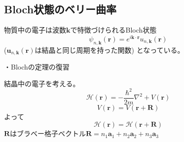 \documentclass[a4paper,11pt,dvipdfmx]{jsarticle}
\theoremstyle{definition}%
\numberwithin{equation}{section}%
\numberwithin{theorem}{section} %
\begin{document}
  \subsection{Bloch状態のベリー曲率}
  物質中の電子は波数\(\bm{k}\)で特徴づけられるBloch状態
  \begin{equation}
    \psi_{n,\bm{k}}(\bm{r})=e^{i\bm{k}\cdot\bm{r}}u_{n,\bm{k}}(\bm{r})\tag{1.4.1}
  \end{equation}
  (\(\bm{u}_{n,\bm{k}}(\bm{r})\)は結晶と同じ周期を持った関数)
となっている。


・Blochの定理の復習

結晶中の電子を考える。
\begin{equation}
	\mathcal{H}(\bm{r}) = -\frac{\hbar^2}{2m}\nabla^2 + V(\bm{r}) \label{1.4.2}
\end{equation}
\begin{equation}
	V(\bm{r}) = V(\bm{r} + \bm{R}) \label{1.4.3}
\end{equation}
よって
\begin{equation}
	\mathcal{H}(\bm{r}) = \mathcal{H}(\bm{r}+\bm{R}) \label{1.4.4}
\end{equation}
\(\bm{R}\)はブラベー格子ベクトル\(\bm{R} = n_1\bm{a}_1 + n_2\bm{a}_2 + n_3\bm{a}_3\)
\end{document}
